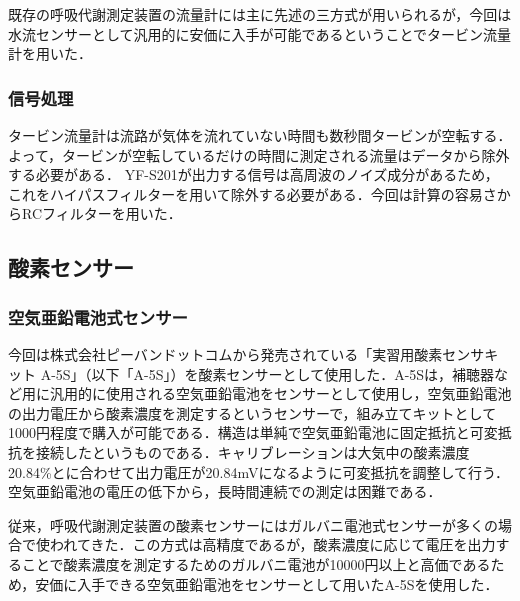 

既存の呼吸代謝測定装置の流量計には主に先述の三方式が用いられるが，今回は水流センサーとして汎用的に安価に入手が可能であるということでタービン流量計を用いた．

\subsubsection{信号処理}

タービン流量計は流路が気体を流れていない時間も数秒間タービンが空転する．よって，タービンが空転しているだけの時間に測定される流量はデータから除外する必要がある．
YF-S201が出力する信号は高周波のノイズ成分があるため，これをハイパスフィルターを用いて除外する必要がある．今回は計算の容易さからRCフィルターを用いた．

\subsection{酸素センサー}

\subsubsection{空気亜鉛電池式センサー}

今回は株式会社ピーバンドットコムから発売されている「実習用酸素センサキット A-5S」（以下「A-5S」）を酸素センサーとして使用した．A-5Sは，補聴器など用に汎用的に使用される空気亜鉛電池をセンサーとして使用し，空気亜鉛電池の出力電圧から酸素濃度を測定するというセンサーで，組み立てキットとして1000円程度で購入が可能である．構造は単純で空気亜鉛電池に固定抵抗と可変抵抗を接続したというものである．キャリブレーションは大気中の酸素濃度20.84\%とに合わせて出力電圧が20.84mVになるように可変抵抗を調整して行う．空気亜鉛電池の電圧の低下から，長時間連続での測定は困難である．

従来，呼吸代謝測定装置の酸素センサーにはガルバニ電池式センサーが多くの場合で使われてきた．この方式は高精度であるが，酸素濃度に応じて電圧を出力することで酸素濃度を測定するためのガルバニ電池が10000円以上と高価であるため，安価に入手できる空気亜鉛電池をセンサーとして用いたA-5Sを使用した．

